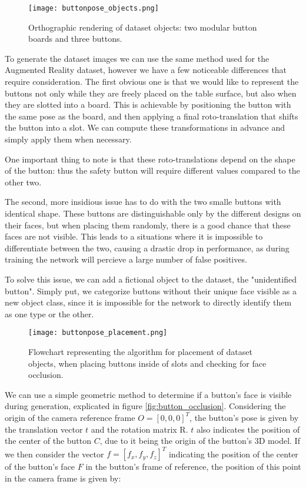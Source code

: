 \begin{figure}[ht]
    \texttt{[image: buttonpose\_objects.png]}
    \caption{Orthographic rendering of dataset objects: two modular button boards and three buttons.}
    \label{fig:buttonpose_objects}
\end{figure}

To generate the dataset images we can use the same method used for the Augmented Reality dataset, however we have a few noticeable differences that require consideration. The first obvious one is that we would like to represent the buttons not only while they are freely placed on the table surface, but also when they are slotted into a board. This is achievable by positioning the button with the same pose as the board, and then applying a final roto-translation that shifts the button into a slot. We can compute these transformations in advance and simply apply them when necessary.

One important thing to note is that these roto-translations depend on the shape of the button: thus the safety button will require different values compared to the other two.

The second, more insidious issue has to do with the two smalle buttons with identical shape. These buttons are distinguishable only by the different designs on their faces, but when placing them randomly, there is a good chance that these faces are not visible. This leads to a situations where it is impossible to differentiate between the two, causing a drastic drop in performance, as during training the network will percieve a large number of false positives.

To solve this issue, we can add a fictional object to the dataset, the "unidentified button". Simply put, we categorize buttons without their unique face visible as a new object class, since it is impossible for the network to directly identify them as one type or the other.

\begin{figure}[ht]
    \texttt{[image: buttonpose\_placement.png]}
    \caption{Flowchart representing the algorithm for placement of dataset objects, when placing buttons inside of slots and checking for face occlusion.}
    \label{fig:buttonpose_placement}
\end{figure}

We can use a simple geometric method to determine if a button's face is visible during generation, explicated in figure \ref{fig:button_occlusion}. Considering the origin of the camera reference frame $O = [0, 0, 0]^T$, the button's pose is given by the translation vector $t$ and the rotation matrix R. $t$ also indicates the position of the center of the button $C$, due to it being the origin of the button's 3D model. If we then consider the vector $f = [f_x, f_y, f_z]^T$ indicating the position of the center of the button's face $F$ in the button's frame of reference, the position of this point in the camera frame is given by:

